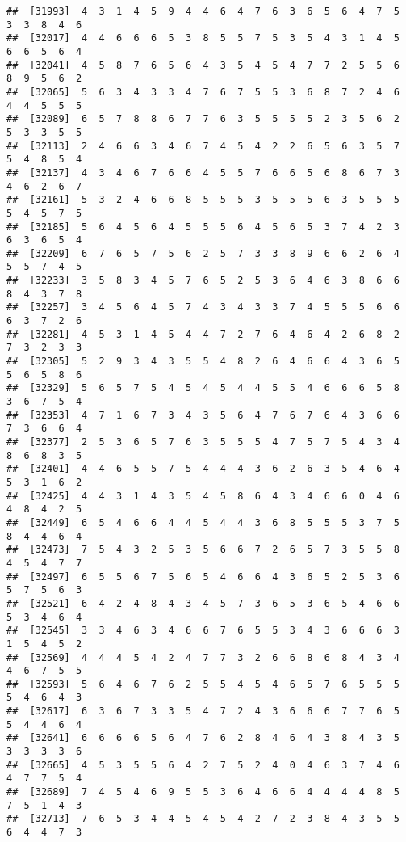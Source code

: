 \documentclass[
]{book}
\begin{document}
\begin{verbatim}
##  [31993]  4  3  1  4  5  9  4  4  6  4  7  6  3  6  5  6  4  7  5  3  3  8  4  6
##  [32017]  4  4  6  6  6  5  3  8  5  5  7  5  3  5  4  3  1  4  5  6  6  5  6  4
##  [32041]  4  5  8  7  6  5  6  4  3  5  4  5  4  7  7  2  5  5  6  8  9  5  6  2
##  [32065]  5  6  3  4  3  3  4  7  6  7  5  5  3  6  8  7  2  4  6  4  4  5  5  5
##  [32089]  6  5  7  8  8  6  7  7  6  3  5  5  5  5  2  3  5  6  2  5  3  3  5  5
##  [32113]  2  4  6  6  3  4  6  7  4  5  4  2  2  6  5  6  3  5  7  5  4  8  5  4
##  [32137]  4  3  4  6  7  6  6  4  5  5  7  6  6  5  6  8  6  7  3  4  6  2  6  7
##  [32161]  5  3  2  4  6  6  8  5  5  5  3  5  5  5  6  3  5  5  5  5  4  5  7  5
##  [32185]  5  6  4  5  6  4  5  5  5  6  4  5  6  5  3  7  4  2  3  6  3  6  5  4
##  [32209]  6  7  6  5  7  5  6  2  5  7  3  3  8  9  6  6  2  6  4  5  5  7  4  5
##  [32233]  3  5  8  3  4  5  7  6  5  2  5  3  6  4  6  3  8  6  6  8  4  3  7  8
##  [32257]  3  4  5  6  4  5  7  4  3  4  3  3  7  4  5  5  5  6  6  6  3  7  2  6
##  [32281]  4  5  3  1  4  5  4  4  7  2  7  6  4  6  4  2  6  8  2  7  3  2  3  3
##  [32305]  5  2  9  3  4  3  5  5  4  8  2  6  4  6  6  4  3  6  5  5  6  5  8  6
##  [32329]  5  6  5  7  5  4  5  4  5  4  4  5  5  4  6  6  6  5  8  3  6  7  5  4
##  [32353]  4  7  1  6  7  3  4  3  5  6  4  7  6  7  6  4  3  6  6  7  3  6  6  4
##  [32377]  2  5  3  6  5  7  6  3  5  5  5  4  7  5  7  5  4  3  4  8  6  8  3  5
##  [32401]  4  4  6  5  5  7  5  4  4  4  3  6  2  6  3  5  4  6  4  5  3  1  6  2
##  [32425]  4  4  3  1  4  3  5  4  5  8  6  4  3  4  6  6  0  4  6  4  8  4  2  5
##  [32449]  6  5  4  6  6  4  4  5  4  4  3  6  8  5  5  5  3  7  5  8  4  4  6  4
##  [32473]  7  5  4  3  2  5  3  5  6  6  7  2  6  5  7  3  5  5  8  4  5  4  7  7
##  [32497]  6  5  5  6  7  5  6  5  4  6  6  4  3  6  5  2  5  3  6  5  7  5  6  3
##  [32521]  6  4  2  4  8  4  3  4  5  7  3  6  5  3  6  5  4  6  6  5  3  4  6  4
##  [32545]  3  3  4  6  3  4  6  6  7  6  5  5  3  4  3  6  6  6  3  1  5  4  5  2
##  [32569]  4  4  4  5  4  2  4  7  7  3  2  6  6  8  6  8  4  3  4  4  6  7  5  5
##  [32593]  5  6  4  6  7  6  2  5  5  4  5  4  6  5  7  6  5  5  5  5  4  6  4  3
##  [32617]  6  3  6  7  3  3  5  4  7  2  4  3  6  6  6  7  7  6  5  5  4  4  6  4
##  [32641]  6  6  6  6  5  6  4  7  6  2  8  4  6  4  3  8  4  3  5  3  3  3  3  6
##  [32665]  4  5  3  5  5  6  4  2  7  5  2  4  0  4  6  3  7  4  6  4  7  7  5  4
##  [32689]  7  4  5  4  6  9  5  5  3  6  4  6  6  4  4  4  4  8  5  7  5  1  4  3
##  [32713]  7  6  5  3  4  4  5  4  5  4  2  7  2  3  8  4  3  5  5  6  4  4  7  3

\end{verbatim}
\end{document}
